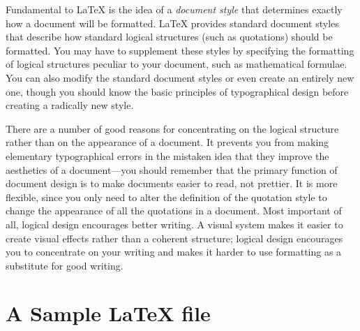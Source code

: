 Fundamental to \LaTeX{} is the idea of a {\em document style\/} that
determines exactly how a document will be formatted.  \LaTeX{} provides
standard document styles that describe how standard logical structures
(such as quotations) should be formatted.  You may have to supplement
these styles by specifying the formatting of logical structures
peculiar to your document, such as mathematical formulae.  You can
also modify the standard document styles or even create an entirely
new one, though you should know the basic principles of typographical
design before creating a radically new style.

There are a number of good reasons for concentrating on the logical
structure rather than on the appearance of a document.  It prevents
you from making elementary typographical errors in the mistaken
idea that they improve the aesthetics of a document---you should
remember that the primary function of document design is to make
documents easier to read, not prettier.  It is more flexible, since
you only need to alter the definition of the quotation style
to change the appearance of all the quotations in a document.  Most
important of all, logical design encourages better writing.
A visual system makes it easier to create visual effects rather than
a coherent structure; logical design encourages you to concentrate on
your writing and makes it harder to use formatting as a substitute
for good writing.

\section{A Sample \LaTeX{} file}

